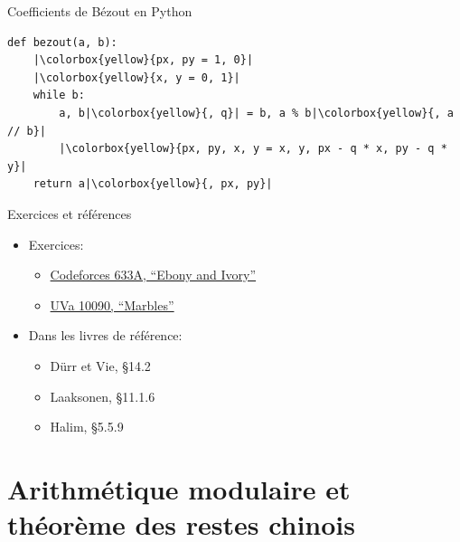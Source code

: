\documentclass{main}
\begin{document}
\setlength{\fboxsep}{0pt}
\begin{frame}[fragile]{Coefficients de Bézout en Python}
    \begin{verbatim}
def bezout(a, b):
    |\colorbox{yellow}{px, py = 1, 0}|
    |\colorbox{yellow}{x, y = 0, 1}|
    while b:
        a, b|\colorbox{yellow}{, q}| = b, a % b|\colorbox{yellow}{, a // b}|
        |\colorbox{yellow}{px, py, x, y = x, y, px - q * x, py - q * y}|
    return a|\colorbox{yellow}{, px, py}|
    \end{verbatim}
\end{frame}

\begin{frame}{Exercices et références}
    \begin{itemize}
        \item Exercices:
        \begin{itemize}
            \item \href{https://vjudge.net/problem/CodeForces-633A}{Codeforces 633A, “Ebony and Ivory”}
            \item \href{https://vjudge.net/problem/UVA-10090}{UVa 10090, “Marbles”}
        \end{itemize}
        \item Dans les livres de référence:
        \begin{itemize}
            \item Dürr et Vie, §14.2
            \item Laaksonen, §11.1.6
            \item Halim, §5.5.9
        \end{itemize}
    \end{itemize}
\end{frame}

\section{Arithmétique modulaire et théorème des restes chinois}
\maketoc
\end{document}
